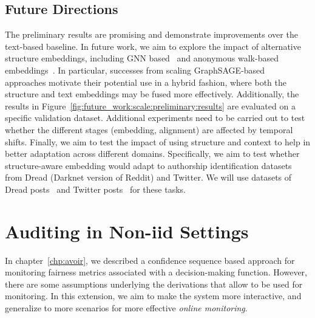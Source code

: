 \subsection{Future Directions}
The preliminary results are promising and demonstrate improvements over the text-based baseline.
In future work, we aim to explore the impact of alternative structure embeddings, including GNN based~\cite{velivckovic2018graph,hamilton2017inductive} and anonymous walk-based embeddings~\citep{ivanov2018anonymous,wang2020inductive}.
In particular, successes from scaling GraphSAGE-based~\cite{hamilton2017inductive,ying2018graph} approaches motivate their potential use in a hybrid fashion, where both the structure and text embeddings may be fused more effectively.
Additionally, the results in Figure~\ref{fig:future_work:scale:preliminary:results} are evaluated on a specific validation dataset.
Additional experiments need to be carried out to test whether the different stages (embedding, alignment) are affected by temporal shifts.
Finally, we aim to test the impact of using structure and context to help in better adaptation across different domains.
Specifically, we aim to test whether structure-aware embedding would adapt to authorship identification datasets from Dread (Darknet version of Reddit) and Twitter.
We will use datasets of Dread posts~\cite{pastrana2018crimebb} and Twitter posts~\cite{andrews2019learning} for these tasks.

\section{Auditing in Non-iid Settings}
\label{sec:future_work:monitoring}

In chapter~\ref{chp:avoir},  we described a confidence sequence based approach for monitoring fairness metrics associated with a decision-making function.
However, there are some assumptions underlying the derivations that allow \AVOIRmethodname{} to be used for monitoring.
In this extension, we aim to make the \AVOIRmethodname{} system more interactive, and generalize to more scenarios for more effective \textit{online monitoring}.

